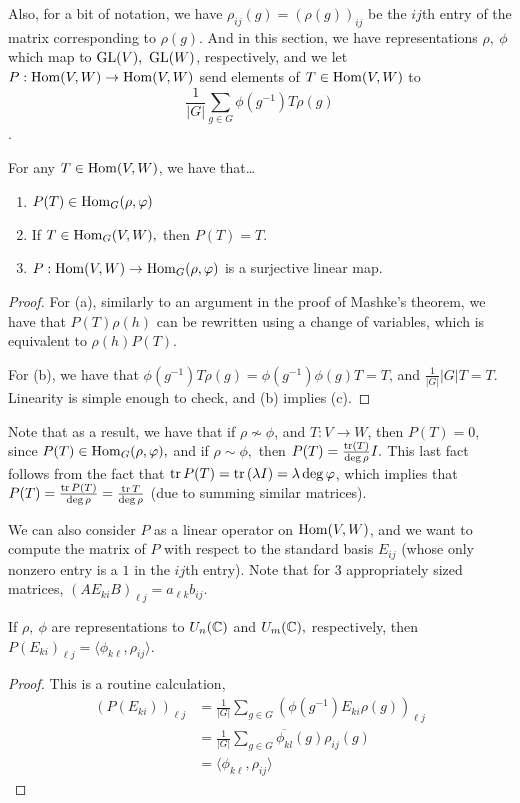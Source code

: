 \documentclass{article}
\begin{document}
Also, for a bit of notation, we have $\rho_{ij}(g) = (\rho(g))_{ij}$ be the $ij$th entry of the matrix corresponding to $\rho(g)$. And in this section, we have representations $\rho, \ \phi$ which map to $\operatorname{GL}(V), \ \operatorname{GL}(W)$, respectively, and we let $P : \operatorname{Hom}(V,W) \to \operatorname{Hom}(V,W)$ send elements of $T \in \operatorname{Hom}(V,W)$ to $$\frac{1}{|G|} \sum_{g \in G} \phi(g^{-1})T\rho(g)$$.

\begin{lemma}
For any $T \in \operatorname{Hom}(V,W)$, we have that\ldots
\begin{enumerate}[label=(\alph*)]
    \item $P(T) \in \operatorname{Hom}_G(\rho,\varphi)$
    \item If $T \in \operatorname{Hom}_G(V,W),$ then $P(T)=T$.
    \item $P : \operatorname{Hom}(V,W) \to \operatorname{Hom}_G(\rho,\varphi)$ is a surjective linear map.
\end{enumerate}
\end{lemma}

\begin{proof}

For (a), similarly to an argument in the proof of Mashke's theorem, we have that $P(T)\rho(h)$ can be rewritten using a change of variables, which is equivalent to $\rho(h)P(T).$

For (b), we have that $\phi(g^{-1})T\rho(g)=\phi(g^{-1})\phi(g)T=T$, and $\frac{1}{|G|} |G|T = T$. Linearity is simple enough to check, and (b) implies (c).

\end{proof}

Note that as a result, we have that if $\rho \not\sim \phi$, and $T : V \to W$, then $P(T) = 0$, since $P(T) \in \operatorname{Hom}_G(\rho,\varphi),$ and if $\rho \sim \phi,$ then $P(T) = \frac{\operatorname{tr} (T)}{\deg \rho} I.$ This last fact follows from the fact that $\operatorname{tr} P(T)= \operatorname{tr} \left( \lambda I \right) = \lambda \deg \varphi$, which implies that $P(T) = \frac{\operatorname{tr} P(T)}{\deg \rho} = \frac{\operatorname{tr} T}{\deg \rho}$ (due to summing similar matrices). 

We can also consider $P$ as a linear operator on $\operatorname{Hom}(V,W)$, and we want to compute the matrix of $P$ with respect to the standard basis $E_{ij}$ (whose only nonzero entry is a $1$ in the $ij$th entry). Note that for 3 appropriately sized matrices, $(AE_{ki}B)_{\ell j} = a_{\ell k}b_{ij}$.

\begin{lemma}

If $\rho, \ \phi$ are representations to $U_n(\mathbb C)$ and $U_m(\mathbb C),$ respectively, then $P(E_{ki})_{\ell j} = \langle \phi_{k\ell}, \rho_{ij} \rangle$.

\end{lemma}
\begin{proof}
This is a routine calculation,
\begin{align*}
    (P(E_{ki}))_{\ell j} &= \frac{1}{|G|} \sum_{g \in G} (\phi(g^{-1})E_{ki}\rho(g))_{\ell j} \\
    &= \frac{1}{|G|} \sum_{g \in G} \overline{\phi_{kl}}(g)\rho_{ij}(g) \\
    &= \langle \phi_{k\ell}, \rho_{ij}\rangle
\end{align*}
\end{proof}
\end{document}
